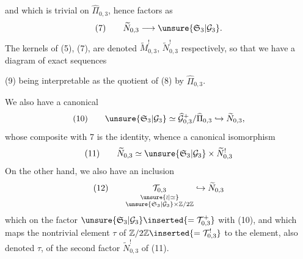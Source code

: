 
and which is trivial on $\widehat{\Pi}_{0,3}$, hence factors as
\[
(7)\qquad\widetilde N_{0,3}\longrightarrow\unsure{\mathfrak S_3|\mathcal G_3}.
\]
The kernels of (5), (7), are denoted $\widetilde M_{0,3}^{!}$, $\widetilde N_{0,3}^{!}$ respectively, so that we have a diagram of exact sequences


(9) being interpretable as the quotient of (8) by $\widehat{\Pi}_{0,3}$.


We also have a canonical 
\[
(10)\qquad\unsure{\mathfrak S_3|\mathcal G_3}\simeq\widehat{\mathcal G}_{0,3}^{+}/\widehat{\Pi}_{0,3}\hookrightarrow\widetilde N_{0,3},
\]
whose composite with 7 is the identity, whence a canonical isomorphism
\[
(11)\qquad\widetilde N_{0,3}\simeq\unsure{\mathfrak S_3|\mathcal G_3}\times\widetilde N_{0,3}^{!}
\]
On the other hand, we also have an inclusion
\[
(12)\qquad
\underset{\substack{\unsure{\wr|\simeq}\\\unsure{\mathfrak S_3|\mathcal G_3}\times\mathbb Z/2\mathbb Z}}{\mathcal T_{0,3}}
\hookrightarrow\widetilde N_{0,3}
\]
which on the factor $\unsure{\mathfrak S_3|\mathcal G_3}\inserted{=\mathcal T_{0,3}^{+}}$  with (10), and which  maps the nontrivial element $\tau$ of $\mathbb Z/2\mathbb Z\inserted{=\mathcal T_{0,3}^{!}}$ to the element, also denoted $\tau$, of the second factor $\widetilde N_{0,3}^{!}$ of (11).


